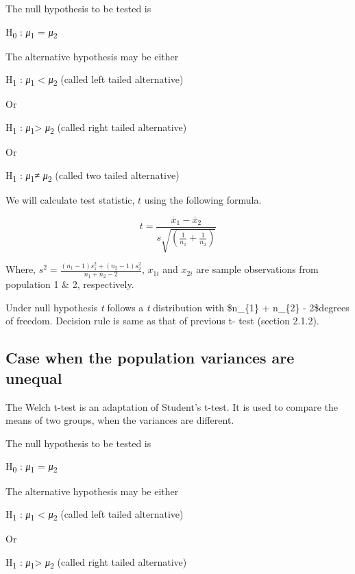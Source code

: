 \documentclass[
]{book}
\begin{document}
The null hypothesis to be tested is

H\textsubscript{0} : \emph{μ}\textsubscript{1} = \emph{μ}\textsubscript{2}

The alternative hypothesis may be either

H\textsubscript{1} : \emph{μ}\textsubscript{1} \textless{} \emph{μ}\textsubscript{2} (called left tailed alternative)

Or

H\textsubscript{1} : \emph{μ}\textsubscript{1}\textgreater{} \emph{μ}\textsubscript{2} (called right tailed alternative)

Or

H\textsubscript{1} : \emph{μ}\textsubscript{1}≠ \emph{μ}\textsubscript{2} (called two tailed alternative)

We will calculate test statistic, \(t\) using the following formula.

\[t = \frac{{\overline{x}}_{1} - {\overline{x}}_{2}}{s\sqrt{\left( \frac{1}{n_{1}} + \frac{1}{n_{2}} \right)}}\]

Where, \(s^{2} = \frac{(n_{1}-1)s_{1}^2+(n_{2}-1)s_{2}^2}{n_{1} + n_{2} - 2}\), \(x_{1i}\) and \(x_{2i}\) are sample observations from population 1 \& 2, respectively.

Under null hypothesis \emph{t} follows a \emph{t} distribution with \$n\_\{1\} + n\_\{2\} - 2\$degrees of freedom. Decision rule is same as that of previous t- test (section 2.1.2).

\hypertarget{case-when-the-population-variances-are-unequal}{%
\subsection{Case when the population variances are unequal}\label{case-when-the-population-variances-are-unequal}}

The Welch t-test is an adaptation of Student's t-test. It is used to compare the means of two groups, when the variances are different.

The null hypothesis to be tested is

H\textsubscript{0} : \emph{μ}\textsubscript{1} = \emph{μ}\textsubscript{2}

The alternative hypothesis may be either

H\textsubscript{1} : \emph{μ}\textsubscript{1} \textless{} \emph{μ}\textsubscript{2} (called left tailed alternative)

Or

H\textsubscript{1} : \emph{μ}\textsubscript{1}\textgreater{} \emph{μ}\textsubscript{2} (called right tailed alternative)
\end{document}
